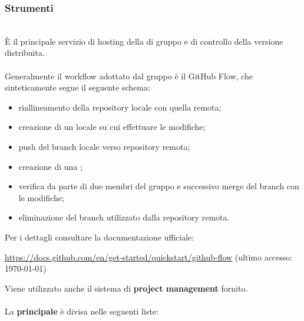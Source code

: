 \subsubsection{Strumenti}
\\
È il principale servizio di hosting della  di gruppo e di controllo della versione distribuita. 
\\\\
Generalmente il workflow adottato dal gruppo è il GitHub Flow, che sinteticamente segue il seguente schema:
\begin{itemize}
  \item riallineamento della repository locale con quella remota;
  \item creazione di un  locale su cui effettuare le modifiche;
  \item push del branch locale verso repository remota;
  \item creazione di una ;
  \item verifica da parte di due membri del gruppo e successivo merge del branch con le modifiche;
  \item eliminazione del branch utilizzato dalla repository remota.
\end{itemize}
Per i dettagli consultare la documentazione ufficiale: 
\begin{center}
 \href{https://docs.github.com/en/get-started/quickstart/github-flow}{{https://docs.github.com/en/get-started/quickstart/github-flow}}
    (ultimo accesso: \today)
\end{center}
\medskip
Viene utilizzato anche il sistema di \textbf{project management} fornito.\\\\
La \textbf{ principale} è divisa nelle seguenti liste:
